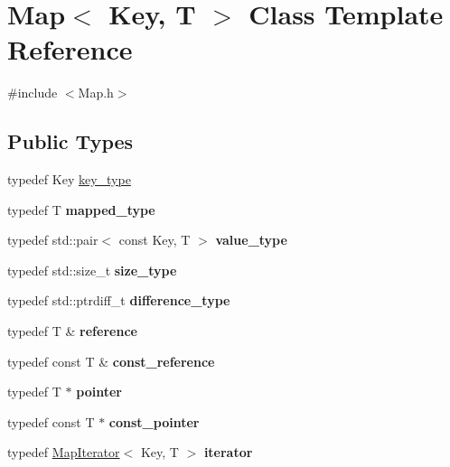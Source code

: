 \hypertarget{classMap}{}\section{Map$<$ Key, T $>$ Class Template Reference}
\label{classMap}


{\ttfamily \#include $<$Map.\+h$>$}

\subsection*{Public Types}
\begin{DoxyCompactItemize}
\item 
typedef Key \hyperlink{classMap_a430e42d1c6a02e95eb3a34626e313441}{key\+\_\+type}
\item 
\mbox{\label{classMap_a67af90a93788106a4bccb7bdb25b4043}} 
typedef T {\bfseries mapped\+\_\+type}
\item 
\mbox{\label{classMap_aac88b3259dbb03265913dac381f5e1d1}} 
typedef std\+::pair$<$ const Key, T $>$ {\bfseries value\+\_\+type}
\item 
\mbox{\label{classMap_a92a41f8b7d75190387ba5f65288e4c64}} 
typedef std\+::size\+\_\+t {\bfseries size\+\_\+type}
\item 
\mbox{\label{classMap_a2fffa438b772dcf7f9db4d0384679742}} 
typedef std\+::ptrdiff\+\_\+t {\bfseries difference\+\_\+type}
\item 
\mbox{\label{classMap_af61f1c5b574090f135a59b3e1d024c06}} 
typedef T \& {\bfseries reference}
\item 
\mbox{\label{classMap_a6fff6ed0e54b268611c65a108d85a773}} 
typedef const T \& {\bfseries const\+\_\+reference}
\item 
\mbox{\label{classMap_ab90bca9d06d6b3739239a448e38b4d72}} 
typedef T $\ast$ {\bfseries pointer}
\item 
\mbox{\label{classMap_a64f8defdb22a1919b59b3930f562b48c}} 
typedef const T $\ast$ {\bfseries const\+\_\+pointer}
\item 
\mbox{\label{classMap_a33941ca37977f3ff447f1917abadb24e}} 
typedef \hyperlink{classMapIterator}{Map\+Iterator}$<$ Key, T $>$ {\bfseries iterator}
\end{DoxyCompactItemize}
